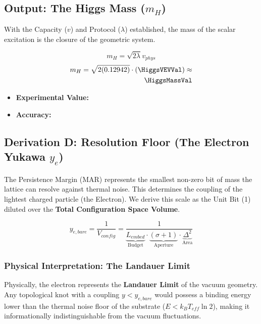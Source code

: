 \subsection{Output: The Higgs Mass (\texorpdfstring{$m_H$}{mH})}
With the Capacity ($v$) and Protocol ($\lambda$) established, the mass of the scalar excitation is the closure of the geometric system.

\begin{equation}
m_H = \sqrt{2\lambda} v_{phys}
\end{equation}
\begin{equation}
\begin{split}
m_H = \sqrt{2 (0.12942)} \cdot (\HiggsVEVVal) \approx \\
\mathbf{\HiggsMassVal}
\end{split}
\end{equation}

\begin{itemize}
    \item \textbf{Experimental Value:} \HiggsMassExperimentalValue
    \item \textbf{Accuracy:} \HiggsMassAccText
\end{itemize}


\subsection{Derivation D: Resolution Floor (The Electron Yukawa \texorpdfstring{$y_e$}{ye})}

The Persistence Margin (MAR) represents the smallest non-zero bit of mass the lattice can resolve against thermal noise. This determines the coupling of the lightest charged particle (the Electron). We derive this scale as the Unit Bit (1) diluted over the \textbf{Total Configuration Space Volume}.

\begin{equation}
y_{e,bare} = \frac{1}{V_{config}} = \frac{1}{\underbrace{L_{embed}}_{\text{Budget}} \cdot \underbrace{(\sigma+1)}_{\text{Aperture}} \cdot \underbrace{\Delta^2}_{\text{Area}}}
\end{equation}

\subsubsection{Physical Interpretation: The Landauer Limit}
Physically, the electron represents the \textbf{Landauer Limit} of the vacuum geometry. Any topological knot with a coupling $y < y_{e,bare}$ would possess a binding energy lower than the thermal noise floor of the substrate ($E < k_B T_{eff} \ln 2$), making it informationally indistinguishable from the vacuum fluctuations.

